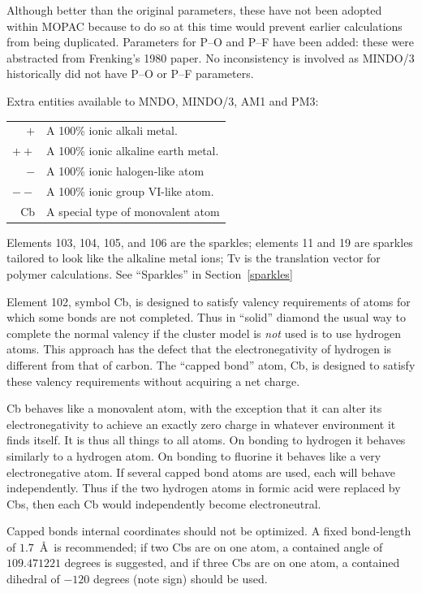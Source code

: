 Although better than the original parameters, these  have  not  been
adopted  within MOPAC because to do so at this time would prevent earlier
calculations from being duplicated.  Parameters for P--O and P--F have been
added:    these   were   abstracted   from  Frenking's  1980  paper.   No
inconsistency is involved as MINDO/3 historically did not have P--O or P--F
parameters.

Extra entities available to MNDO, MINDO/3, AM1 and PM3:

\begin{tabular}{rl}
   $  + $ & A 100\% ionic alkali metal.    \\
   $ ++ $ & A 100\% ionic alkaline earth metal.    \\
   $  - $ & A 100\% ionic halogen-like atom    \\
   $ -- $ & A 100\% ionic group VI-like atom.    \\
     Cb   & A special type of monovalent atom
\end{tabular}

Elements 103, 104, 105, and 106 are the sparkles; elements 11 and 19 are
sparkles  tailored  to  look like the alkaline metal ions; Tv is the
translation vector for polymer calculations.  See ``Sparkles''  in
Section~\ref{sparkles}

Element 102, symbol Cb, is designed to satisfy valency  requirements
of atoms for which some bonds are not completed.  Thus in ``solid'' diamond
the usual way to complete the normal valency if the cluster model is {\em not} used
is to use
hydrogen  atoms.  This approach has the defect that the electronegativity
of hydrogen is different from that of carbon.  The ``capped bond''  atom,
Cb, is designed to satisfy these valency requirements without acquiring a
net charge.

Cb behaves like a monovalent atom, with the exception  that  it  can
alter its electronegativity to achieve an exactly zero charge in whatever
environment it finds itself.  It is thus all things  to  all  atoms.   On
bonding to hydrogen it behaves similarly to a hydrogen atom.  On bonding to
fluorine it behaves like a very electronegative atom.  If several  capped
bond  atoms  are  used,  each will behave independently.  Thus if the two
hydrogen atoms in formic acid were replaced by Cbs, then  each  Cb  would
independently become electroneutral.

Capped bonds internal coordinates should not be optimized.  A  fixed
bond-length of $1.7$~\AA\ is recommended; if two Cbs are on one atom, a
contained angle of $109.471221$ degrees is suggested, and if three  Cbs  are
on  one  atom, a contained dihedral of $-120$ degrees (note sign) should be
used.

